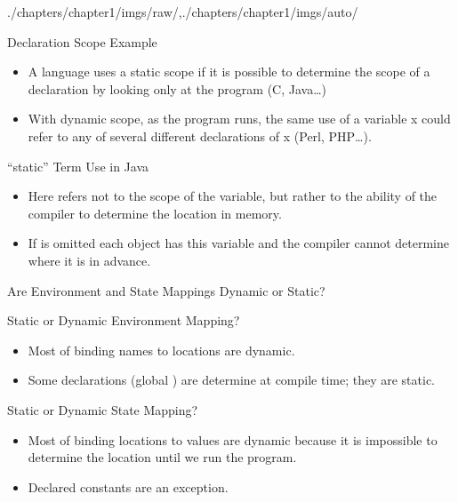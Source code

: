 \begin{graphicspathcontext}{{./chapters/chapter1/imgs/raw/},{./chapters/chapter1/imgs/auto/}}
\begin{bibunit}[apalike]
\begin{frame}{{Declaration Scope} Example}
	\begin{itemize}
	\item A language uses a static scope if it is possible to determine the scope of a declaration by looking only at the program (C, Java\dots)
	\vfill
	\item With dynamic scope, as the program runs, the same use of a variable x could refer to any of several different declarations of x (Perl, PHP\dots).
	\end{itemize}
\end{frame}

\begin{frame}{{``static'' Term Use} in Java}
	\begin{center}
	\end{center}
	\vfill
	\begin{itemize}
	\item Here  refers not to the scope of the variable, but rather to the ability of the compiler to determine the location in memory.
	\vfill
	\item If  is omitted each object has this variable and the compiler cannot determine where it is in advance.
	\end{itemize}
\end{frame}

\begin{frame}{{Are Environment and State Mappings Dynamic or Static?}}
	\begin{block}{Static or Dynamic Environment Mapping?}
	\begin{itemize}
	\item Most of binding names to locations are dynamic.
	\item Some declarations (\eg global ) are determine at compile time; they are static.
	\end{itemize}
	\end{block}
	\begin{block}{Static or Dynamic State Mapping?}
	\begin{itemize}
	\item Most of binding locations to values are dynamic because it is impossible to determine the location until we run the program.
	\item Declared constants are an exception.
	\end{itemize}
	\end{block}
\end{frame}


\end{bibunit}
\end{graphicspathcontext}
